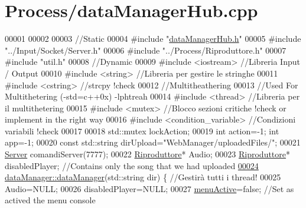 \hypertarget{dataManagerHub_8cpp_source}{\section{\-Process/data\-Manager\-Hub.cpp}
}

\begin{DoxyCode}
00001 
00002 
00003 \textcolor{comment}{//Static}
00004 \textcolor{preprocessor}{#include "\hyperlink{dataManagerHub_8h}{dataManagerHub.h}"}
00005 \textcolor{preprocessor}{#include "../Input/Socket/Server.h"}
00006 \textcolor{preprocessor}{#include "../Process/Riproduttore.h"}
00007 \textcolor{preprocessor}{#include "util.h"}
00008 \textcolor{comment}{//Dynamic}
00009 \textcolor{preprocessor}{#include <iostream>}                             \textcolor{comment}{//Libreria Input / Output}
00010 \textcolor{preprocessor}{#include <string>}                                   \textcolor{comment}{//Libreria per gestire le
       stringhe}
00011 \textcolor{preprocessor}{#include <cstring>}                              \textcolor{comment}{//strcpy !check}
00012 \textcolor{comment}{//Multitheathering}
00013 \textcolor{comment}{//Used For Multithetering (-std=c++0x) -lphtreah}
00014 \textcolor{preprocessor}{#include <thread>}                                   \textcolor{comment}{//Libreria per il
       multithetering}
00015 \textcolor{preprocessor}{#include <mutex>}                                    \textcolor{comment}{//Blocco sezioni critiche
       !check or implement in the right way}
00016 \textcolor{preprocessor}{#include <condition\_variable>}                       \textcolor{comment}{//Condizioni variabili
       !check}
00017 
00018 std::mutex lockAction;
00019 \textcolor{keywordtype}{int} action=-1; \textcolor{keywordtype}{int} app=-1;
00020 \textcolor{keyword}{const} std::string dirUpload=\textcolor{stringliteral}{"WebManager/uploadedFiles/"};
00021 \hyperlink{classServer}{Server} comandiServer(7777);
00022 \hyperlink{classRiproduttore}{Riproduttore}*   Audio;
00023 \hyperlink{classRiproduttore}{Riproduttore}*   disabledPlayer; \textcolor{comment}{//Contains only the song that we had uploaded}
\hypertarget{dataManagerHub_8cpp_source_l00024}{}\hyperlink{classdataManager_a53882fb8b2d08f1b73f6c8e9202c5ae4}{00024} \hyperlink{classdataManager_a53882fb8b2d08f1b73f6c8e9202c5ae4}{dataManager::dataManager}(std::string dir) \{ \textcolor{comment}{//Gestirà tutti i thread!}
00025     Audio=NULL;
00026     disabledPlayer=NULL;
00027     \hyperlink{classdataManager_a7126a92f131b786ecf68b7a27d58d814}{menuActive}=\textcolor{keyword}{false};                     \textcolor{comment}{//Set as actived the menu console
}
\end{DoxyCode}
